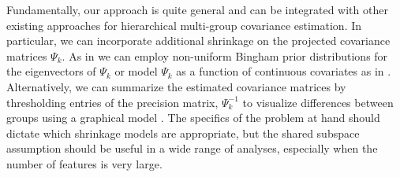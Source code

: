 \documentclass[12pt]{article}
\begin{document}

Fundamentally, our approach is quite general and can be integrated
with other existing approaches for hierarchical multi-group covariance
estimation.  In particular, we can incorporate additional shrinkage on
the projected covariance matrices $\Psi_k$.  As in \citet{Hoff2009} we
can employ non-uniform Bingham prior distributions for the
eigenvectors of $\Psi_k$ or model $\Psi_k$ as a function of continuous
covariates as in \citet{Yin2010, Hoff2011}.  Alternatively, we can
summarize the estimated covariance matrices by thresholding entries of
the precision matrix, $\Psi_k^{-1}$ to visualize differences between
groups using a graphical model \citet{Meinshausen2006}.  The specifics
of the problem at hand should dictate which shrinkage models are
appropriate, but the shared subspace assumption should be useful in a
wide range of analyses, especially when the number of features is very
large.






\end{document}
